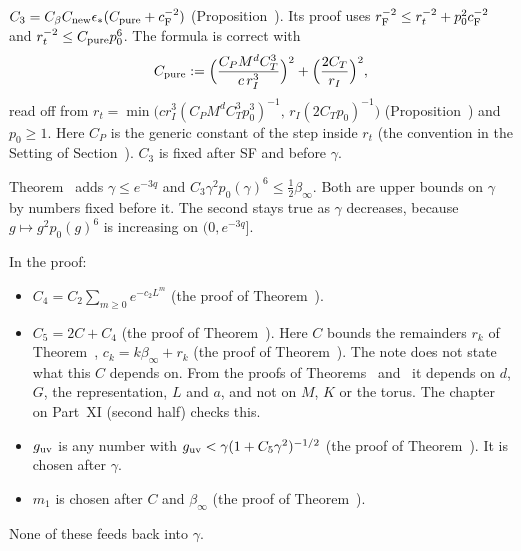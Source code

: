 \begin{detail}
\begin{step}\label{det:ledger-gamma-C3}
$C_3=C_\beta C_{\rm new}\epsilon_*(C_{\rm pure}+c_{\rm F}^{-2})$ (Proposition~). Its proof uses $r_{\rm F}^{-2}\le r_t^{-2}+p_0^2c_{\rm F}^{-2}$ and $r_t^{-2}\le C_{\rm pure}p_0^6$. The formula is correct with
\[
C_{\rm pure}:=\Big(\frac{C_PM^dC_T^3}{c\,r_I^3}\Big)^2+\Big(\frac{2C_T}{r_I}\Big)^2 ,
\]
read off from $r_t=\min\big(cr_I^3(C_PM^dC_T^3p_0^3)^{-1},\,r_I(2C_Tp_0)^{-1}\big)$ (Proposition~) and $p_0\ge1$. Here $C_P$ is the generic constant of the step inside $r_t$ (the convention in the Setting of Section~). $C_3$ is fixed after SF and before $\gamma$.
\end{step}

\begin{step}
Theorem~ adds $\gamma\le e^{-3q}$ and $C_3\gamma^2p_0(\gamma)^6\le\frac12\beta_\infty$. Both are upper bounds on $\gamma$ by numbers fixed before it. The second stays true as $\gamma$ decreases, because $g\mapsto g^2p_0(g)^6$ is increasing on $(0,e^{-3q}]$.

In the proof:
\begin{itemize}
\item $C_4=C_2\sum_{m\ge0}e^{-c_2L^m}$ (the proof of Theorem~).
\item $C_5=2C+C_4$ (the proof of Theorem~). Here $C$ bounds the remainders $r_k$ of Theorem~, $c_k=k\beta_\infty+r_k$ (the proof of Theorem~). The note does not state what this $C$ depends on. From the proofs of Theorems~ and~ it depends on $d$, $G$, the representation, $L$ and $a$, and not on $M$, $K$ or the torus. The chapter on Part~XI (second half) checks this.
\item $g_{\rm uv}$ is any number with $g_{\rm uv}<\gamma(1+C_5\gamma^2)^{-1/2}$ (the proof of Theorem~). It is chosen after $\gamma$.
\item $m_1$ is chosen after $C$ and $\beta_\infty$ (the proof of Theorem~).
\end{itemize}
None of these feeds back into $\gamma$.
\end{step}
\end{detail}

